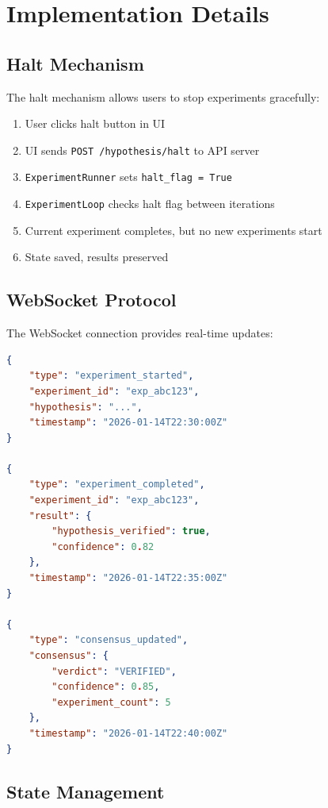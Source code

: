 \documentclass{book}
\begin{document}
\chapter{Implementation Details}

\section{Halt Mechanism}

The halt mechanism allows users to stop experiments gracefully:

\begin{enumerate}
    \item User clicks halt button in UI
    \item UI sends \texttt{POST /hypothesis/halt} to API server
    \item \texttt{ExperimentRunner} sets \texttt{halt\_flag = True}
    \item \texttt{ExperimentLoop} checks halt flag between iterations
    \item Current experiment completes, but no new experiments start
    \item State saved, results preserved
\end{enumerate}

\section{WebSocket Protocol}

The WebSocket connection provides real-time updates:

\begin{lstlisting}[language=JSON, caption=WebSocket Message Format]
{
    "type": "experiment_started",
    "experiment_id": "exp_abc123",
    "hypothesis": "...",
    "timestamp": "2026-01-14T22:30:00Z"
}

{
    "type": "experiment_completed",
    "experiment_id": "exp_abc123",
    "result": {
        "hypothesis_verified": true,
        "confidence": 0.82
    },
    "timestamp": "2026-01-14T22:35:00Z"
}

{
    "type": "consensus_updated",
    "consensus": {
        "verdict": "VERIFIED",
        "confidence": 0.85,
        "experiment_count": 5
    },
    "timestamp": "2026-01-14T22:40:00Z"
}
\end{lstlisting}

\section{State Management}
\end{document}
